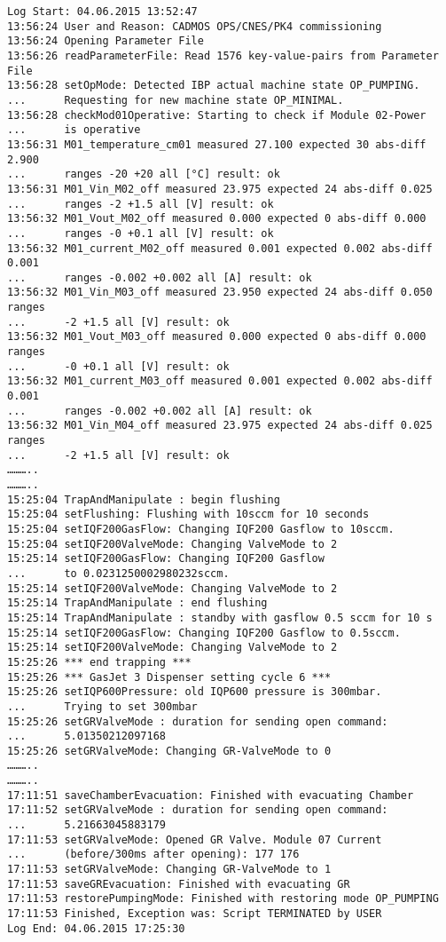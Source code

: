\begin{small}
\begin{verbatim}
Log Start: 04.06.2015 13:52:47
13:56:24 User and Reason: CADMOS OPS/CNES/PK4 commissioning
13:56:24 Opening Parameter File
13:56:26 readParameterFile: Read 1576 key-value-pairs from Parameter File
13:56:28 setOpMode: Detected IBP actual machine state OP_PUMPING.
...      Requesting for new machine state OP_MINIMAL.
13:56:28 checkMod01Operative: Starting to check if Module 02-Power
...      is operative
13:56:31 M01_temperature_cm01 measured 27.100 expected 30 abs-diff 2.900
...      ranges -20 +20 all [°C] result: ok
13:56:31 M01_Vin_M02_off measured 23.975 expected 24 abs-diff 0.025
...      ranges -2 +1.5 all [V] result: ok
13:56:32 M01_Vout_M02_off measured 0.000 expected 0 abs-diff 0.000
...      ranges -0 +0.1 all [V] result: ok
13:56:32 M01_current_M02_off measured 0.001 expected 0.002 abs-diff 0.001
...      ranges -0.002 +0.002 all [A] result: ok
13:56:32 M01_Vin_M03_off measured 23.950 expected 24 abs-diff 0.050 ranges
...      -2 +1.5 all [V] result: ok
13:56:32 M01_Vout_M03_off measured 0.000 expected 0 abs-diff 0.000 ranges
...      -0 +0.1 all [V] result: ok
13:56:32 M01_current_M03_off measured 0.001 expected 0.002 abs-diff 0.001
...      ranges -0.002 +0.002 all [A] result: ok
13:56:32 M01_Vin_M04_off measured 23.975 expected 24 abs-diff 0.025 ranges
...      -2 +1.5 all [V] result: ok
………..
………..
15:25:04 TrapAndManipulate : begin flushing
15:25:04 setFlushing: Flushing with 10sccm for 10 seconds
15:25:04 setIQF200GasFlow: Changing IQF200 Gasflow to 10sccm.
15:25:04 setIQF200ValveMode: Changing ValveMode to 2
15:25:14 setIQF200GasFlow: Changing IQF200 Gasflow
...      to 0.0231250002980232sccm.
15:25:14 setIQF200ValveMode: Changing ValveMode to 2
15:25:14 TrapAndManipulate : end flushing
15:25:14 TrapAndManipulate : standby with gasflow 0.5 sccm for 10 s
15:25:14 setIQF200GasFlow: Changing IQF200 Gasflow to 0.5sccm.
15:25:14 setIQF200ValveMode: Changing ValveMode to 2
15:25:26 *** end trapping ***
15:25:26 *** GasJet 3 Dispenser setting cycle 6 ***
15:25:26 setIQP600Pressure: old IQP600 pressure is 300mbar.
...      Trying to set 300mbar
15:25:26 setGRValveMode : duration for sending open command:
...      5.01350212097168
15:25:26 setGRValveMode: Changing GR-ValveMode to 0
………..
………..
17:11:51 saveChamberEvacuation: Finished with evacuating Chamber
17:11:52 setGRValveMode : duration for sending open command:
...      5.21663045883179
17:11:53 setGRValveMode: Opened GR Valve. Module 07 Current
...      (before/300ms after opening): 177 176
17:11:53 setGRValveMode: Changing GR-ValveMode to 1
17:11:53 saveGREvacuation: Finished with evacuating GR
17:11:53 restorePumpingMode: Finished with restoring mode OP_PUMPING
17:11:53 Finished, Exception was: Script TERMINATED by USER
Log End: 04.06.2015 17:25:30
\end{verbatim}
\end{small}
